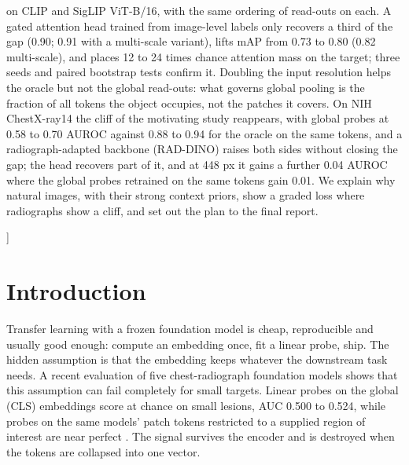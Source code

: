 \documentclass[10pt,letterpaper,twocolumn]{article}
\begin{document}
\begin{@twocolumnfalse}
\begin{list}{}{\setlength{\leftmargin}{0.55in}\setlength{\rightmargin}{0.55in}}
on CLIP and SigLIP ViT-B/16, with the same ordering of read-outs on each. A gated attention head trained from image-level labels only
recovers a third of the gap (0.90; 0.91 with a multi-scale variant), lifts mAP from 0.73 to
0.80 (0.82 multi-scale), and places 12 to 24 times chance attention mass on the target; three
seeds and paired bootstrap tests confirm it. Doubling the input resolution helps the oracle
but not the global read-outs: what governs global pooling is the fraction of all tokens the
object occupies, not the patches it covers. On NIH ChestX-ray14 the cliff of the motivating
study reappears, with global probes at 0.58 to 0.70 AUROC against 0.88 to 0.94 for the oracle
on the same tokens, and a radiograph-adapted backbone (RAD-DINO) raises both sides without
closing the gap; the head recovers part of it, and at 448 px it gains a further 0.04 AUROC where the global probes retrained on the same tokens gain 0.01. We explain why natural images, with
their strong context priors, show a graded loss where radiographs show a cliff, and set out
the plan to the final report.
\end{list}
\vspace{14pt}
\end{@twocolumnfalse}
]
\makeatother

\section{Introduction}
Transfer learning with a frozen foundation model is cheap, reproducible and usually good
enough: compute an embedding once, fit a linear probe, ship. The hidden assumption is that the
embedding keeps whatever the downstream task needs. A recent evaluation of five chest-radiograph
foundation models shows that this assumption can fail completely for small targets. Linear
probes on the global (CLS) embeddings score at chance on small lesions, AUC 0.500 to 0.524,
while probes on the same models' patch tokens restricted to a supplied region of interest are
near perfect \citep{smalllesion2026}. The signal survives the encoder and is destroyed when the
tokens are collapsed into one vector.
\end{document}
